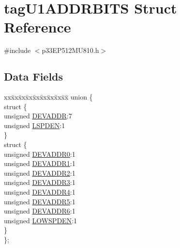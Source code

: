 \hypertarget{structtag_u1_a_d_d_r_b_i_t_s}{}\section{tag\+U1\+A\+D\+D\+R\+B\+I\+TS Struct Reference}
\label{structtag_u1_a_d_d_r_b_i_t_s}


{\ttfamily \#include $<$p33\+E\+P512\+M\+U810.\+h$>$}

\subsection*{Data Fields}
\begin{DoxyCompactItemize}
\item 
\begin{tabbing}
xx\=xx\=xx\=xx\=xx\=xx\=xx\=xx\=xx\=\kill
union \{\\
\>struct \{\\
\>\>unsigned \hyperlink{structtag_u1_a_d_d_r_b_i_t_s_aba7afc5c038e5fedba4928597bd3f54d}{DEVADDR}:7\\
\>\>unsigned \hyperlink{structtag_u1_a_d_d_r_b_i_t_s_aa916ca79a5ee19e099a3f0470086fbe4}{LSPDEN}:1\\
\>\} \\
\>struct \{\\
\>\>unsigned \hyperlink{structtag_u1_a_d_d_r_b_i_t_s_adc6ced697dcfcd04dba50677e2c92967}{DEVADDR0}:1\\
\>\>unsigned \hyperlink{structtag_u1_a_d_d_r_b_i_t_s_a1294190a48ac5a0e1decc992d428913c}{DEVADDR1}:1\\
\>\>unsigned \hyperlink{structtag_u1_a_d_d_r_b_i_t_s_a0acd9ab21467147f88a5bc7b2ef981d5}{DEVADDR2}:1\\
\>\>unsigned \hyperlink{structtag_u1_a_d_d_r_b_i_t_s_aa2efd20afeb6c26c3dd16c4efb648471}{DEVADDR3}:1\\
\>\>unsigned \hyperlink{structtag_u1_a_d_d_r_b_i_t_s_a5ad87bca57c8e08cb02f85adc5c10dc8}{DEVADDR4}:1\\
\>\>unsigned \hyperlink{structtag_u1_a_d_d_r_b_i_t_s_a2fd19ec41c56328d584a00d40d11b80d}{DEVADDR5}:1\\
\>\>unsigned \hyperlink{structtag_u1_a_d_d_r_b_i_t_s_a484492545aa62091188674fd61aa7ac5}{DEVADDR6}:1\\
\>\>unsigned \hyperlink{structtag_u1_a_d_d_r_b_i_t_s_a6ee3c1641567870690afd488d4d0c616}{LOWSPDEN}:1\\
\>\} \\
\}; \\

\end{tabbing}\end{DoxyCompactItemize}


